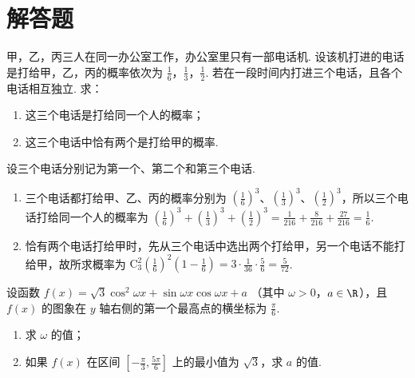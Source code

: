 \section{解答题}
\begin{problem}
甲，乙，丙三人在同一办公室工作，办公室里只有一部电话机. 设该机打进的电话是打给甲，乙，丙的概率依次为 \(\frac{1}{6}\)，\(\frac{1}{3}\)，\(\frac{1}{2}\). 若在一段时间内打进三个电话，且各个电话相互独立. 求：

\begin{enumerate}
\item 这三个电话是打给同一个人的概率；
\item 这三个电话中恰有两个是打给甲的概率.
\end{enumerate}
\end{problem}

\begin{solution}
设三个电话分别记为第一个、第二个和第三个电话.

\begin{enumerate}
\item 三个电话都打给甲、乙、丙的概率分别为 \(\left(\frac{1}{6}\right)^3\)、\(\left(\frac{1}{3}\right)^3\)、\(\left(\frac{1}{2}\right)^3\)，所以三个电话打给同一个人的概率为 \(\left(\frac{1}{6}\right)^3+\left(\frac{1}{3}\right)^3+\left(\frac{1}{2}\right)^3=\frac{1}{216}+\frac{8}{216}+\frac{27}{216}=\frac{1}{6}\).
\item 恰有两个电话打给甲时，先从三个电话中选出两个打给甲，另一个电话不能打给甲，故所求概率为 \(\mathrm C_3^2\left(\frac{1}{6}\right)^2\left(1-\frac{1}{6}\right)=3\cdot\frac{1}{36}\cdot\frac{5}{6}=\frac{5}{72}\).
\end{enumerate}
\end{solution}

\begin{problem}
设函数 \( f(x) = \sqrt{3}\cos^2\omega x + \sin \omega x\cos \omega x + a \) （其中 \(\omega > 0\)，\(a \in \R\)），且 \( f(x) \) 的图象在 \( y \) 轴右侧的第一个最高点的横坐标为 \( \frac{\pi}{6} \).

\begin{enumerate}
\item 求 \(\omega\) 的值；
\item 如果 \( f(x) \) 在区间 \(\left[-\frac{\pi}{3}, \frac{5\pi}{6}\right]\) 上的最小值为 \(\sqrt{3}\)，求 \(a\) 的值.
\end{enumerate}
\end{problem}

